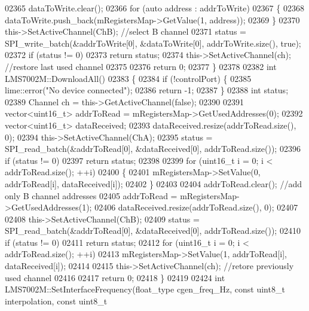 \begin{DoxyCode}
{{{{{{{{{{{{{{{{{{{{{{{{{{{{{{{{{{{{{{{{{{{{{{{{{{{{{{{{{{{{{{{{02365     dataToWrite.clear();
02366     \textcolor{keywordflow}{for} (\textcolor{keyword}{auto} address : addrToWrite)
02367     \{
02368         dataToWrite.push\_back(mRegistersMap->GetValue(1, address));
02369     \}
02370     this->SetActiveChannel(ChB); \textcolor{comment}{//select B channel}
02371     status = SPI_write_batch(&addrToWrite[0], &dataToWrite[0], addrToWrite.size(), \textcolor{keyword}{true});
02372     \textcolor{keywordflow}{if} (status != 0)
02373         \textcolor{keywordflow}{return} status;
02374     this->SetActiveChannel(ch); \textcolor{comment}{//restore last used channel}
02375 
02376     \textcolor{keywordflow}{return} 0;
02377 \}
02378 
02382 \textcolor{keywordtype}{int} LMS7002M::DownloadAll()
02383 \{
02384     \textcolor{keywordflow}{if} (!controlPort) \{
02385         lime::error(\textcolor{stringliteral}{"No device connected"});
02386         \textcolor{keywordflow}{return} -1;
02387     \}
02388     \textcolor{keywordtype}{int} status;
02389     Channel ch = this->GetActiveChannel(\textcolor{keyword}{false});
02390 
02391     vector<uint16\_t> addrToRead = mRegistersMap->GetUsedAddresses(0);
02392     vector<uint16\_t> dataReceived;
02393     dataReceived.resize(addrToRead.size(), 0);
02394     this->SetActiveChannel(ChA);
02395     status = SPI_read_batch(&addrToRead[0], &dataReceived[0], addrToRead.size());
02396     \textcolor{keywordflow}{if} (status != 0)
02397         \textcolor{keywordflow}{return} status;
02398 
02399     \textcolor{keywordflow}{for} (uint16\_t i = 0; i < addrToRead.size(); ++i)
02400     \{
02401         mRegistersMap->SetValue(0, addrToRead[i], dataReceived[i]);
02402     \}
02403 
02404     addrToRead.clear(); \textcolor{comment}{//add only B channel addresses}
02405     addrToRead = mRegistersMap->GetUsedAddresses(1);
02406     dataReceived.resize(addrToRead.size(), 0);
02407 
02408     this->SetActiveChannel(ChB);
02409     status = SPI_read_batch(&addrToRead[0], &dataReceived[0], addrToRead.size());
02410     \textcolor{keywordflow}{if} (status != 0)
02411         \textcolor{keywordflow}{return} status;
02412     \textcolor{keywordflow}{for} (uint16\_t i = 0; i < addrToRead.size(); ++i)
02413         mRegistersMap->SetValue(1, addrToRead[i], dataReceived[i]);
02414 
02415     this->SetActiveChannel(ch); \textcolor{comment}{//retore previously used channel}
02416 
02417     \textcolor{keywordflow}{return} 0;
02418 \}
02419 
02424 \textcolor{keywordtype}{int} LMS7002M::SetInterfaceFrequency(float_type cgen\_freq\_Hz, \textcolor{keyword}{const} uint8\_t interpolation, \textcolor{keyword}{const} uint8\_t 
}}}}}}}}}}}}}}}}}}}}}}}}}}}}}}}}}}}}}}}}}}}}}}}}}}}}}}}}}}}}}}}}
\end{DoxyCode}

